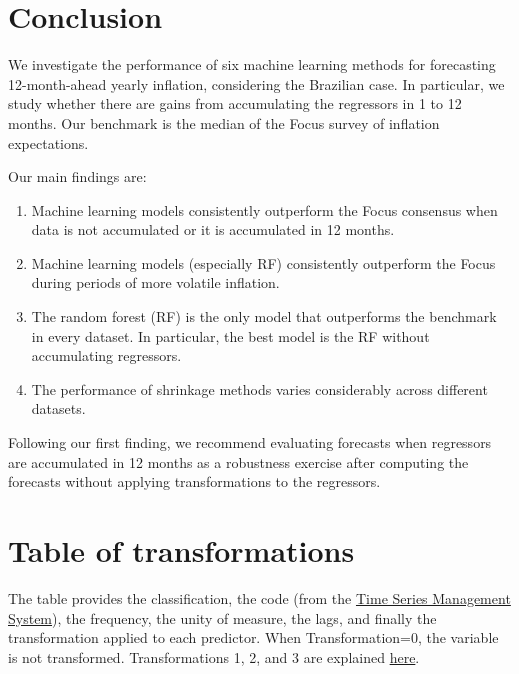\documentclass[12pt,openright,twoside,a4paper,brazil,english,emptypage,openany]{abntex2}
\begin{document}
\chapter{Conclusion}

\hspace{1em} We investigate the performance of six machine learning methods for forecasting 12-month-ahead yearly inflation, considering the Brazilian case. In particular, we study whether there are gains from accumulating the regressors in 1 to 12 months. Our benchmark is the median of the Focus survey of inflation expectations. 

Our main findings are:

\begin{enumerate}
    \item Machine learning models consistently outperform the Focus consensus when data is not accumulated or it is accumulated in 12 months. 

    \item Machine learning models (especially RF) consistently outperform the Focus during periods of more volatile inflation.

    \item The random forest (RF) is the only model that outperforms the benchmark in every dataset. In particular, the best model is the RF without accumulating regressors.

    \item The performance of shrinkage methods varies considerably across different datasets. 
    
\end{enumerate}

Following our first finding, we recommend evaluating forecasts when regressors are accumulated in 12 months as a robustness exercise after computing the forecasts without applying transformations to the regressors.






\appendix






\chapter{Table of transformations}
\label{sec:transformation.table}

\hspace{1em} The table provides the classification, the code (from the \href{https://www3.bcb.gov.br/sgspub/localizarseries/localizarSeries.do?method=prepararTelaLocalizarSeries}{Time Series Management System}), the frequency, the unity of measure, the lags, and finally the transformation applied to each predictor. When Transformation=0, the variable is not transformed. Transformations 1, 2, and 3 are explained \hyperref[sec:transformations]{here}.
\end{document}
